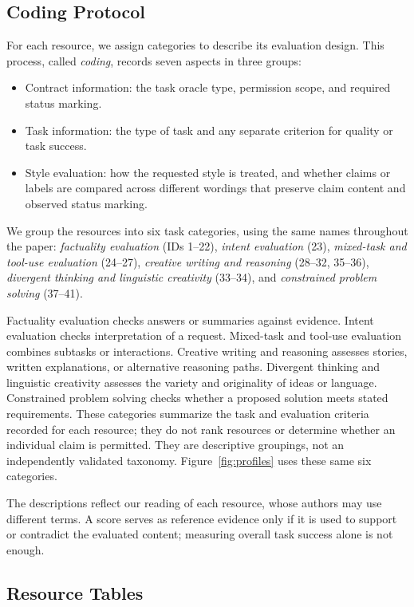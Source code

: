 \documentclass{clv2025}
\begin{document}
\subsection{Coding Protocol}

For each resource, we assign categories to describe its evaluation design.
This process, called \emph{coding}, records seven aspects in three groups:
\begin{itemize}
\item Contract information: the task oracle type, permission scope, and required
status marking.
\item Task information: the type of task and any separate criterion for
quality or task success.
\item Style evaluation: how the requested style is treated, and whether
claims or labels are compared across different wordings that preserve claim
content and observed status marking.
\end{itemize}
We group the resources into six task categories, using the same names
throughout the paper: \emph{factuality evaluation} (IDs 1--22),
\emph{intent evaluation} (23), \emph{mixed-task and tool-use evaluation}
(24--27), \emph{creative writing and reasoning} (28--32, 35--36),
\emph{divergent thinking and linguistic creativity} (33--34), and
\emph{constrained problem solving} (37--41).

Factuality evaluation checks answers or summaries against evidence. Intent
evaluation checks interpretation of a request. Mixed-task and tool-use
evaluation combines subtasks or interactions. Creative writing and reasoning
assesses stories, written explanations, or alternative reasoning paths.
Divergent thinking and linguistic creativity assesses the variety and
originality of ideas or language. Constrained problem solving checks whether
a proposed solution meets stated requirements. These categories summarize
the task and evaluation criteria recorded for each resource; they do not
rank resources or determine whether an individual claim is permitted.
They are descriptive groupings, not an independently validated taxonomy.
Figure~\ref{fig:profiles} uses these same six categories.

The descriptions reflect our reading of each resource, whose authors may
use different terms. A score serves as reference evidence only if it is used
to support or contradict the evaluated content; measuring overall task
success alone is not enough.

\subsection{Resource Tables}\label{subsec:resource-tables}
\end{document}
